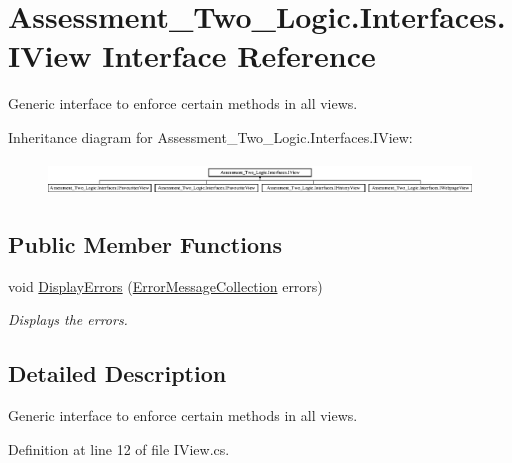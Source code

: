 \hypertarget{interface_assessment___two___logic_1_1_interfaces_1_1_i_view}{
\section{Assessment\_\-Two\_\-Logic.Interfaces.IView Interface Reference}
\label{interface_assessment___two___logic_1_1_interfaces_1_1_i_view}
}


Generic interface to enforce certain methods in all views.  


Inheritance diagram for Assessment\_\-Two\_\-Logic.Interfaces.IView:\begin{figure}[H]
\begin{center}
\leavevmode
\includegraphics[height=0.906149cm]{interface_assessment___two___logic_1_1_interfaces_1_1_i_view}
\end{center}
\end{figure}
\subsection*{Public Member Functions}
\begin{DoxyCompactItemize}
\item 
void \hyperlink{interface_assessment___two___logic_1_1_interfaces_1_1_i_view_a445d0878cbf75de28ba59885d6953e72}{DisplayErrors} (\hyperlink{class_assessment___two___logic_1_1_model_1_1_error_message_collection}{ErrorMessageCollection} errors)
\begin{DoxyCompactList}\small\item\em Displays the errors. \item\end{DoxyCompactList}\end{DoxyCompactItemize}


\subsection{Detailed Description}
Generic interface to enforce certain methods in all views. 

Definition at line 12 of file IView.cs.



